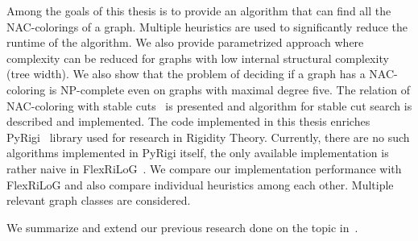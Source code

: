 Among the goals of this thesis is to provide an algorithm
that can find all the NAC-colorings of a graph.
Multiple heuristics are used to significantly
reduce the runtime of the algorithm.
We also provide parametrized approach where complexity can be reduced for graphs
with low internal structural complexity (tree width).
We also show that the problem of deciding if a graph has a NAC-coloring
is NP-complete even on graphs with maximal degree five.
%
The relation of NAC-coloring with stable cuts~\cite{stable_cuts_2v_4} is presented
and algorithm for stable cut search is described and implemented.
%
The code implemented in this thesis enriches PyRigi~\cite{pyrigi}
library used for research in Rigidity Theory.
Currently, there are no such algorithms implemented in PyRigi itself,
the only available implementation is rather naive in FlexRiLoG~\cite{flexrilog}.
We compare our implementation performance with FlexRiLoG and also compare
individual heuristics among each other.
Multiple relevant graph classes are considered.

We summarize and extend our previous research done
on the topic in~\cite{my_paper}.

